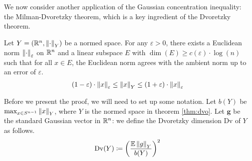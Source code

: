 \documentclass[11pt]{article}
\begin{document}
We now consider another application of the Gaussian concentration inequality: the Milman-Dvoretzky theorem, which is a key ingredient of the Dvoretzky theorem.
\begin{theorem}[Dvoretzky]
  \label{thm:dvo}
  Let $Y = \left( \mathbb{R}^n, \left\lVert\cdot\right\rVert_Y \right)$ be a normed space.
  For any $\varepsilon > 0$, there exists a Euclidean norm $\left\lVert\cdot\right\rVert_\varepsilon$ on $\mathbb{R}^n$ and a linear subspace $E$ with $\dim(E) \geq c(\varepsilon) \cdot \log(n)$ such that for all $x \in E$, the Euclidean norm agrees with the ambient norm up to an error of $\varepsilon$.
  \begin{align*}
    (1-\varepsilon) \cdot \left\lVert x\right\rVert_\varepsilon \leq \left\lVert x\right\rVert_Y \leq (1+\varepsilon)\cdot \left\lVert x\right\rVert_\varepsilon
  \end{align*}
\end{theorem}

Before we present the proof, we will need to set up some notation.
Let $b(Y)$ be $\max_{x \in S^{n-1}} \left\lVert x\right\rVert_Y$, where $Y$ is the normed space in theorem \ref{thm:dvo}.
Let $\mathbf{g}$ be the standard Gaussian vector in $\mathbb{R}^n$: we define the Dvoretzky dimension $\mathrm{Dv}$ of $Y$ as follows.
\begin{align*}
  \mathrm{Dv}(Y) \coloneqq \left( \frac{\mathbb{E} \left\lVert g\right\rVert_Y}{b(Y)} \right)^2
\end{align*}
\end{document}
